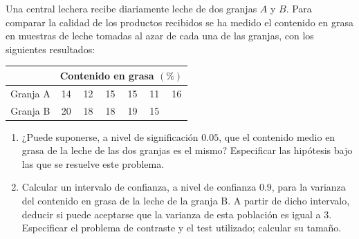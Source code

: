 \begin{ejercicio}%
    Una central lechera recibe diariamente leche de dos granjas $A$ y $B$. Para comparar la calidad de los productos recibidos se ha medido el contenido en grasa en muestras de leche tomadas al azar de cada una de las granjas, con los siguientes resultados:
    \begin{table}[H]
    \centering
    \begin{tabular}{c|cccccc}
     & \multicolumn{6}{c}{Contenido en grasa $(\%)$} \\
     \hline
        Granja A & 14 & 12 & 15 & 15 & 11 & 16 \\
        Granja B & 20 & 18 & 18 & 19 & 15 &
    \end{tabular}
    \end{table}
    \begin{enumerate}[label=\alph*)]
        \item ¿Puede suponerse, a nivel de significación $0.05$, que el contenido medio en grasa de la leche de las dos granjas es el mismo? Especificar las hipótesis bajo las que se resuelve este problema.
        \item Calcular un intervalo de confianza, a nivel de confianza $0.9$, para la varianza del contenido en grasa de la leche de la granja B. A partir de dicho intervalo, deducir si puede aceptarse que la varianza de esta población es igual a 3. Especificar el problema de contraste y el test utilizado; calcular su tamaño.
    \end{enumerate}
\end{ejercicio}
